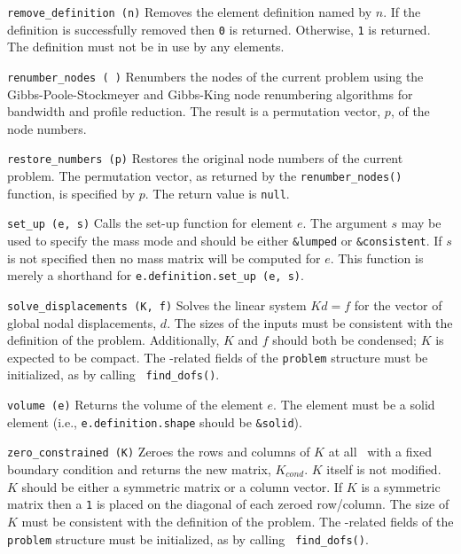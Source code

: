 \begin{dispitems}
\item[\tt remove\_definition (n)]
Removes the element definition named by $n$.  If the definition is
successfully removed then {\tt 0} is returned.  Otherwise, {\tt 1} is
returned.  The definition must not be in use by any elements.

\item[\tt renumber\_nodes ( )]
Renumbers the nodes of the current problem using the
Gibbs-Poole-Stockmeyer and Gibbs-King node renumbering algorithms for
bandwidth and profile reduction.  The result is a permutation vector,
$p$, of the node numbers.

\item[\tt restore\_numbers (p)]
Restores the original node numbers of the current problem.  The
permutation vector, as returned by the {\tt renumber\_nodes()}
function, is specified by $p$.  The return value is {\tt null}.

\item[\tt set\_up (e, s)]
Calls the set-up function for element $e$.  The argument $s$ may be
used to specify the mass mode and should be either {\tt \&lumped} or
{\tt \&consistent}.  If $s$ is not specified then no mass matrix will
be computed for $e$.  This function is merely a shorthand for
{\tt e.definition.set\_up (e, s)}.

\item[\tt solve\_displacements (K, f)]
Solves the linear system $Kd = f$ for the vector of global nodal
displacements, $d$.  The sizes of the inputs must be consistent with
the definition of the problem.  Additionally, $K$ and $f$ should both
be condensed; $K$ is expected to be compact.  The \dof-related fields
of the {\tt problem} structure must be initialized, as by calling {\tt
find\_dofs()}.

\item[\tt volume (e)]
Returns the volume of the element $e$.  The element must be a solid
element (i.e., {\tt e.definition.shape} should be {\tt \&solid}).

\item[\tt zero\_constrained (K)]
Zeroes the rows and columns of $K$ at all \dofs\ with a fixed boundary
condition and returns the new matrix, $K_{cond}$.  $K$ itself is not
modified.  $K$ should be either a symmetric matrix or a column vector.
If $K$ is a symmetric matrix then a {\tt 1} is placed on the diagonal
of each zeroed row/column.  The size of $K$ must be consistent with
the definition of the problem.  The \dof-related fields of the {\tt
problem} structure must be initialized, as by calling {\tt
find\_dofs()}.

\end{dispitems}


